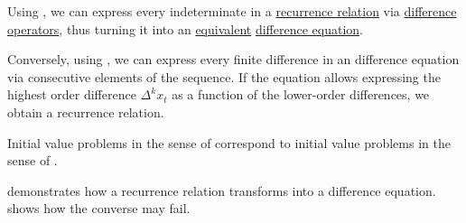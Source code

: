 \begin{proposition}\label{thm:recurrence_relations_and_difference_equations}
  Using , we can express every indeterminate in a \hyperref[def:recurrence_relation]{recurrence relation} via \hyperref[def:finite_difference_operator]{difference operators}, thus turning it into an \hyperref[def:equation/equivalent]{equivalent} \hyperref[def:difference_equation]{difference equation}.

  Conversely, using , we can express every finite difference in an difference equation via consecutive elements of the sequence. If the equation allows expressing the highest order difference \( \Delta^k x_t \) as a function of the lower-order differences, we obtain a recurrence relation.
\end{proposition}
\begin{comments}
  \item Initial value problems in the sense of  correspond to initial value problems in the sense of .

  \item {} demonstrates how a recurrence relation transforms into a difference equation.  shows how the converse may fail.
\end{comments}

